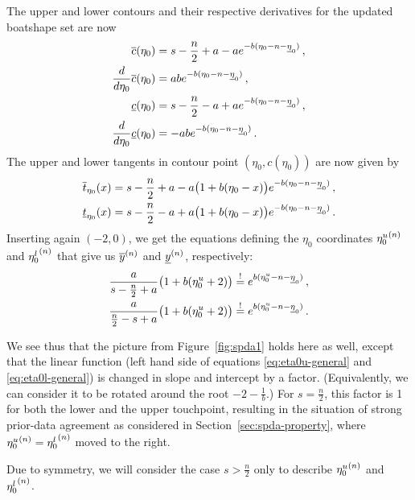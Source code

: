 The upper and lower contours and their respective derivatives for the updated boatshape set are now
\begin{align*}
\overline{c}(\eta_0)                   &= s - \frac{n}{2} + a - a e^{-b(\eta_0 - n - \underline{\eta}_0)} \,,\\
\frac{d}{d\eta_0} \overline{c}(\eta_0) &=                      ab e^{-b(\eta_0 - n - \underline{\eta}_0)} \,,\\
\underline{c}(\eta_0)                   &= s - \frac{n}{2} - a + a e^{-b(\eta_0 - n - \underline{\eta}_0)} \,,\\
\frac{d}{d\eta_0} \underline{c}(\eta_0) &=                     -ab e^{-b(\eta_0 - n - \underline{\eta}_0)} \,.
\end{align*}
The upper and lower tangents in contour point $(\eta_0,c(\eta_0))$ are now given by
\begin{align*}
\overline{t}_{\eta_0}(x) &= s - \frac{n}{2} + a - a \big(1 + b(\eta_0-x)\big) e^{-b(\eta_0 - n - \underline{\eta}_0)} \,,\\
\underline{t}_{\eta_0}(x) &= s - \frac{n}{2} - a + a \big(1 + b(\eta_0-x)\big) e^{-b(\eta_0 - n - \underline{\eta}_0)} \,.
\end{align*}
Inserting again $(-2,0)$, we get the equations defining the $\eta_0$ coordinates
${\eta_0^u}^{(n)}$ and ${\eta_0^l}^{(n)}$
that give us $\overline{y}^{(n)}$ and $\underline{y}^{(n)}$, respectively:
\begin{align}
\label{eq:eta0u-general}
\frac{a}{s - \frac{n}{2} + a} \big(1 + b(\eta_0^u + 2)\big) &\stackrel{!}{=} e^{b(\eta_0^u - n - \underline{\eta}_0)} \,,\\
\label{eq:eta0l-general}
\frac{a}{\frac{n}{2} -s  + a} \big(1 + b(\eta_0^u + 2)\big) &\stackrel{!}{=} e^{b(\eta_0^u - n - \underline{\eta}_0)} \,.
\end{align}

We see thus that the picture from Figure~\ref{fig:spda1} holds here as well,
except that the linear function (left hand side of equations
\eqref{eq:eta0u-general} and \eqref{eq:eta0l-general}) is changed in slope and intercept by a factor.
(Equivalently, we can consider it to be rotated around the root $-2-\frac{1}{b}$.)
For $s=\frac{n}{2}$, this factor is 1 for both the lower and the upper touchpoint,
resulting in the situation of strong prior-data agreement as considered in Section~\ref{sec:spda-property},
where ${\eta_0^u}^{(n)} = {\eta_0^l}^{(n)}$ moved to the right.

Due to symmetry, we will consider the case $s > \frac{n}{2}$ only 
to describe ${\eta_0^u}^{(n)}$ and ${\eta_0^l}^{(n)}$.

